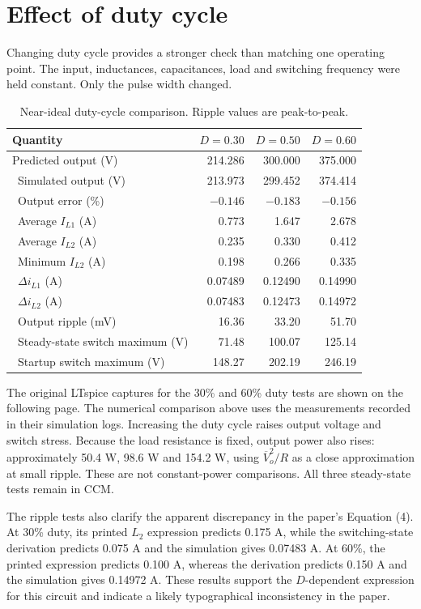\documentclass[11pt,a4paper]{article}
\begin{document}
\section{Effect of duty cycle}\label{sec:duty}
Changing duty cycle provides a stronger check than matching one operating point. The input, inductances, capacitances, load and switching frequency were held constant. Only the pulse width changed.
\begin{table}[H]\centering\caption{Near-ideal duty-cycle comparison. Ripple values are peak-to-peak.}
\begin{tabular}{@{}lrrr@{}}\toprule
Quantity & $D=0.30$ & $D=0.50$ & $D=0.60$ \\\midrule
Predicted output (V) & 214.286 & 300.000 & 375.000 \\\
Simulated output (V) & 213.973 & 299.452 & 374.414 \\\
Output error (\%) & $-0.146$ & $-0.183$ & $-0.156$ \\\
Average $I_{L1}$ (A) & 0.773 & 1.647 & 2.678 \\\
Average $I_{L2}$ (A) & 0.235 & 0.330 & 0.412 \\\
Minimum $I_{L2}$ (A) & 0.198 & 0.266 & 0.335 \\\
$\Delta i_{L1}$ (A) & 0.07489 & 0.12490 & 0.14990 \\\
$\Delta i_{L2}$ (A) & 0.07483 & 0.12473 & 0.14972 \\\
Output ripple (mV) & 16.36 & 33.20 & 51.70 \\\
Steady-state switch maximum (V) & 71.48 & 100.07 & 125.14 \\\
Startup switch maximum (V) & 148.27 & 202.19 & 246.19 \\\bottomrule
\end{tabular}
\end{table}
The original LTspice captures for the 30\% and 60\% duty tests are shown on the following page. The numerical comparison above uses the measurements recorded in their simulation logs.
Increasing the duty cycle raises output voltage and switch stress. Because the load resistance is fixed, output power also rises: approximately 50.4 W, 98.6 W and 154.2 W, using $\overline V_o^2/R$ as a close approximation at small ripple. These are not constant-power comparisons. All three steady-state tests remain in CCM.

The ripple tests also clarify the apparent discrepancy in the paper's Equation (4). At 30\% duty, its printed $L_2$ expression predicts 0.175 A, while the switching-state derivation predicts 0.075 A and the simulation gives 0.07483 A. At 60\%, the printed expression predicts 0.100 A, whereas the derivation predicts 0.150 A and the simulation gives 0.14972 A. These results support the $D$-dependent expression for this circuit and indicate a likely typographical inconsistency in the paper.
\clearpage
\end{document}
